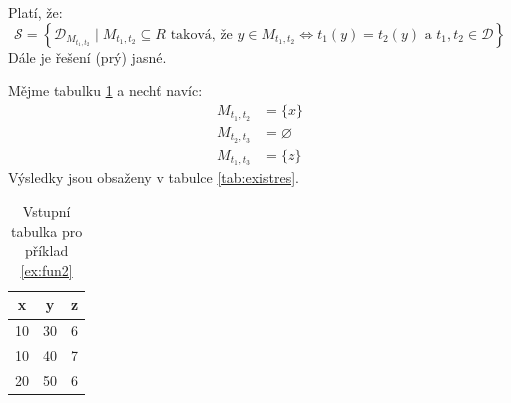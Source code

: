 \begin{upproof}
Platí, že:
$$
\mathcal{S} = \left\{ \mathcal{D}_{M_{t_{1}, t_{2}}} \; | \; M_{t_{1}, t_{2}} \subseteq R \text{ taková, že } y \in M_{t_{1}, t_{2}} \Leftrightarrow t_{1}(y) = t_{2}(y) \text{ a } t_{1}, t_{2} \in \mathcal{D} \right\}
$$
Dále je řešení (prý) jasné.
\end{upproof}
\begin{upexample}\label{ex:fun2}
Mějme tabulku \ref{tab:exist} a nechť navíc:
\begin{align*}
M_{t_{1}, t_{2}} &= \{ x \} \\
M_{t_{2}, t_{3}} &= \varnothing \\
M_{t_{1}, t_{3}} &= \{ z \}
\end{align*}
Výsledky jsou obsaženy v tabulce \ref{tab:existres}.
\end{upexample}
\begin{table}
\centering
\caption{Vstupní tabulka pro příklad \ref{ex:fun2}}\label{tab:exist}
\begin{tabular}{c c c}
x & y & z \\
\hline
10 & 30 & 6 \\
10 & 40 & 7 \\
20 & 50 & 6
\end{tabular}
\end{table}

